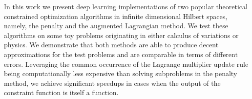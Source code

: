 
In this work we present deep learning implementations of two popular theoretical constrained optimization algorithms in infinite dimensional Hilbert spaces, namely, the penalty and the augmented Lagrangian method. We test these algorithms on some toy problems originating in either calculus of variations or physics. We demonstrate that both methods are able to produce decent approximations for the test problems and are comparable in terms of different errors. Leveraging the common occurrence of the Lagrange multiplier update rule being computationally less expensive than solving subproblems in the penalty method, we achieve significant speedups in cases when the output of the constraint function is itself a function.
